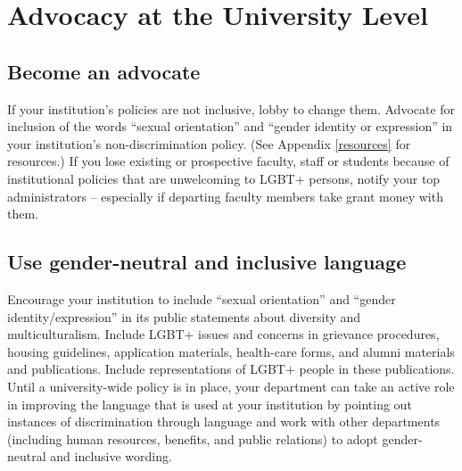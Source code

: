 %

\chapter{Advocacy at the University Level}	%
\label{univ-advocacy}		%
\normalsize			%


\section {Become an advocate}
\label{become-advocate}
If your institution's policies are not inclusive, lobby to change them.  Advocate for inclusion of the words ``sexual orientation'' and ``gender identity or expression'' in your institution's non-discrimination policy.  (See Appendix \ref{resources} for resources.)  If you lose existing or prospective faculty, staff or students because of institutional policies that are unwelcoming to LGBT+ persons, notify your top administrators -- especially if departing faculty members take grant money with them.


\section {Use gender-neutral and inclusive language}
\label{univ-language}
Encourage your institution to include ``sexual orientation'' and ``gender identity/expression'' in its public statements about diversity and multiculturalism.  Include LGBT+ issues and concerns in grievance procedures, housing guidelines, application materials, health-care forms, and alumni materials and publications.  Include representations of LGBT+ people in these publications.  Until a university-wide policy is in place, your department can take an active role in improving the language that is used at your institution by pointing out instances of discrimination through language and work with other departments (including human resources, benefits, and public relations) to adopt gender-neutral and inclusive wording.


